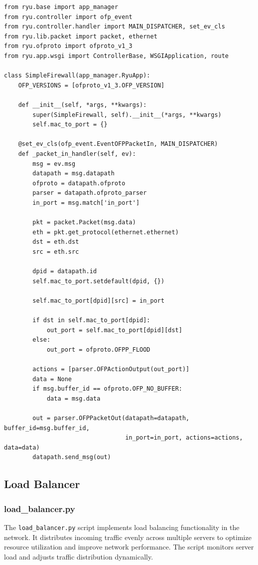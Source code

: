 \documentclass[a4paper,12pt]{article}
\begin{document}
\begin{verbatim}
from ryu.base import app_manager
from ryu.controller import ofp_event
from ryu.controller.handler import MAIN_DISPATCHER, set_ev_cls
from ryu.lib.packet import packet, ethernet
from ryu.ofproto import ofproto_v1_3
from ryu.app.wsgi import ControllerBase, WSGIApplication, route

class SimpleFirewall(app_manager.RyuApp):
    OFP_VERSIONS = [ofproto_v1_3.OFP_VERSION]

    def __init__(self, *args, **kwargs):
        super(SimpleFirewall, self).__init__(*args, **kwargs)
        self.mac_to_port = {}

    @set_ev_cls(ofp_event.EventOFPPacketIn, MAIN_DISPATCHER)
    def _packet_in_handler(self, ev):
        msg = ev.msg
        datapath = msg.datapath
        ofproto = datapath.ofproto
        parser = datapath.ofproto_parser
        in_port = msg.match['in_port']

        pkt = packet.Packet(msg.data)
        eth = pkt.get_protocol(ethernet.ethernet)
        dst = eth.dst
        src = eth.src

        dpid = datapath.id
        self.mac_to_port.setdefault(dpid, {})

        self.mac_to_port[dpid][src] = in_port

        if dst in self.mac_to_port[dpid]:
            out_port = self.mac_to_port[dpid][dst]
        else:
            out_port = ofproto.OFPP_FLOOD

        actions = [parser.OFPActionOutput(out_port)]
        data = None
        if msg.buffer_id == ofproto.OFP_NO_BUFFER:
            data = msg.data

        out = parser.OFPPacketOut(datapath=datapath, buffer_id=msg.buffer_id,
                                  in_port=in_port, actions=actions, data=data)
        datapath.send_msg(out)
\end{verbatim}

\subsection{Load Balancer}

\subsubsection{load\_balancer.py}
The \texttt{load\_balancer.py} script implements load balancing functionality in the network. It distributes incoming traffic evenly across multiple servers to optimize resource utilization and improve network performance. The script monitors server load and adjusts traffic distribution dynamically.
\end{document}
